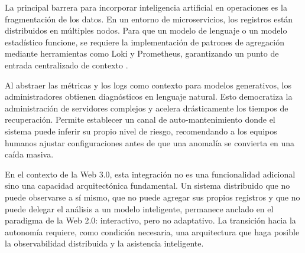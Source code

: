La principal barrera para incorporar inteligencia artificial en operaciones es la fragmentaci\'{o}n de los datos. En un entorno de microservicios, los registros est\'{a}n distribuidos en m\'{u}ltiples nodos. Para que un modelo de lenguaje o un modelo estad\'{i}stico funcione, se requiere la implementaci\'{o}n de patrones de agregaci\'{o}n mediante herramientas como Loki y Prometheus, garantizando un punto de entrada centralizado de contexto \cite{newman2015building}.

Al abstraer las m\'{e}tricas y los logs como contexto para modelos generativos, los administradores obtienen diagn\'{o}sticos en lenguaje natural. Esto democratiza la administraci\'{o}n de servidores complejos y acelera dr\'{a}sticamente los tiempos de recuperaci\'{o}n. Permite establecer un canal de auto-mantenimiento donde el sistema puede inferir su propio nivel de riesgo, recomendando a los equipos humanos ajustar configuraciones antes de que una anomal\'{i}a se convierta en una ca\'{i}da masiva.

En el contexto de la Web 3.0, esta integraci\'{o}n no es una funcionalidad adicional sino una capacidad arquitect\'{o}nica fundamental. Un sistema distribuido que no puede observarse a s\'{i} mismo, que no puede agregar sus propios registros y que no puede delegar el an\'{a}lisis a un modelo inteligente, permanece anclado en el paradigma de la Web 2.0: interactivo, pero no adaptativo. La transici\'{o}n hacia la autonom\'{i}a requiere, como condici\'{o}n necesaria, una arquitectura que haga posible la observabilidad distribuida y la asistencia inteligente.
